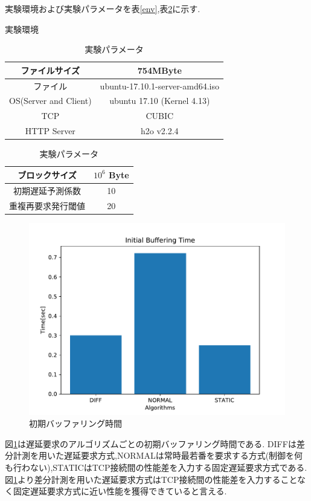 \documentclass[a4j,12pt]{gradthesis_utf8}
\begin{document}
実験環境および実験パラメータを表\ref{env},表\ref{param}に示す.

\begin{table}[htb]
	\begin{center}
		\caption{実験環境}
		\label{env}
		\begin{tabular}{|c|c|} \hline
			ファイルサイズ & 754MByte\\ \hline
			ファイル &  ubuntu-17.10.1-server-amd64.iso\\ \hline
			OS(Server and Client) & ubuntu 17.10 (Kernel 4.13)\\ \hline
			TCP & CUBIC \\ \hline
			HTTP Server & h2o v2.2.4 \\ \hline
		\end{tabular}
		\caption{実験パラメータ}
		\label{param}
		\begin{tabular}{|c|c|} \hline
			ブロックサイズ & \(10^6\) Byte\\ \hline
			初期遅延予測係数 & 10 \\ \hline
			重複再要求発行閾値 & 20 \\ \hline
		\end{tabular}
	\end{center}
\end{table}

\newpage

\begin{figure}[h]
	\begin{center}
		\includegraphics[width=15cm]{figure/InitialBufferingTime.pdf}
		\caption{初期バッファリング時間}
		\label{ibt}
	\end{center}
\end{figure}
図\ref{ibt}は遅延要求のアルゴリズムごとの初期バッファリング時間である.
DIFFは差分計測を用いた遅延要求方式,NORMALは常時最若番を要求する方式(制御を何も行わない),STATICはTCP接続間の性能差を入力する固定遅延要求方式である.
図\ref{ibt}より差分計測を用いた遅延要求方式はTCP接続間の性能差を入力することなく固定遅延要求方式に近い性能を獲得できていると言える.
\end{document}
